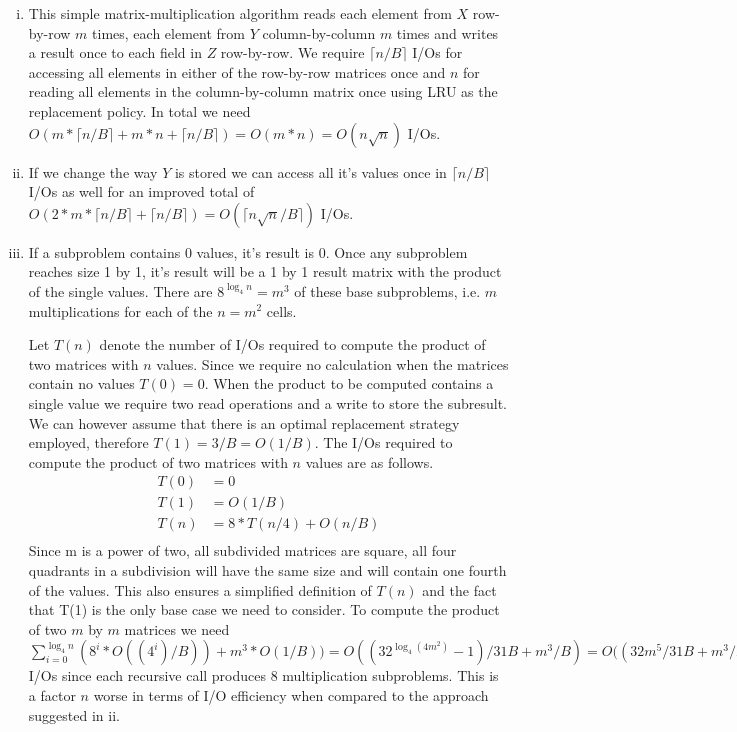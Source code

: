 \begin{enumerate}[(i)]
	\item
This simple matrix-multiplication algorithm reads each element from $X$ row-by-row $m$ times, each element from $Y$ column-by-column $m$ times and writes a result once to each field in $Z$ row-by-row. We require $\lceil n/B \rceil$ I/Os for accessing all elements in either of the row-by-row matrices once and $n$ for reading all elements in the column-by-column matrix once using \textsc{LRU} as the replacement policy. In total we need $O(m * \lceil n/B \rceil + m * n + \lceil n/B \rceil) = O(m * n) = O(n\sqrt{n})$ I/Os.
	\item
If we change the way $Y$ is stored we can access all it's values once in $\lceil n/B \rceil$ I/Os as well for an improved total of $O(2 * m * \lceil n/B \rceil +  \lceil n/B \rceil) = O(\lceil n\sqrt{n}/B \rceil)$ I/Os.
	\item
If a subproblem contains 0 values, it's result is 0. Once any subproblem reaches size 1 by 1, it's result will be a 1 by 1 result matrix with the product of the single values. There are $8^{\log_4{n}} = m^3$ of these base subproblems, i.e. $m$ multiplications for each of the $n = m^2$ cells. 

Let $T(n)$ denote the number of I/Os required to compute the product of two matrices with $n$ values.
Since we require no calculation when the matrices contain no values $T(0) = 0$.
When the product to be computed contains a single value we require two read operations and a write to store the subresult. We can however assume that there is an optimal replacement strategy employed, therefore $T(1) = 3/B = O(1/B)$.
The I/Os required to compute the product of two matrices with $n$ values are as follows.
\begin{equation}
\begin{split}
T(0) &= 0\\
T(1) &= O(1/B)\\
T(n) &= 8*T(n/4) + O(n/B)\\
\end{split}
\end{equation}
Since m is a power of two, all subdivided matrices are square, all four quadrants in a subdivision will have the same size and will contain one fourth of the values. This also ensures a simplified definition of $T(n)$ and the fact that T(1) is the only base case we need to consider. To compute the product of two $m$ by $m$ matrices we need $\sum_{i=0}^{\log_4{n}} (8^i * O((4^i)/B)) + m^3 * O(1/B)) = O((32^{\log_4(4m^2)}-1)/31B + m^3/B) = O((32m^5/31B + m^3/B) = O(m^5/B) = O(n^2\sqrt{n}/B)$ I/Os since each recursive call produces 8 multiplication subproblems. This is a factor $n$ worse in terms of I/O efficiency when compared to the approach suggested in ii.


\end{enumerate}
